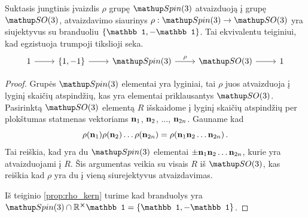 \begin{proposition}
	Suktasis jungtinis įvaizdis $\rho$ grupę $\spin$ atvaizduoją į grupę $\SO3$,
	atvaizdavimo siaurinys $\rho : \spin \to \SO3$ yra siujektyvus
	su branduoliu $\qty{\mathbb1,-\mathbb1}$.
	Tai ekvivalentu teiginiui, kad egzistuoja trumpoji tikslioji seka.
	\begin{equation}
		\begin{tikzcd}
			1 \arrow[r] &\{1,-1\} \arrow[r]	&\spin \arrow[r, "\rho"] &\SO3 \arrow[r] &1
		\end{tikzcd}
	\end{equation}
\end{proposition}
\begin{proof}
	Grupės $\spin$ elementai yra lyginiai,
	tai $\rho$ juos atvaizduoja į lyginį skaičių atspindžių,
	kas yra elementai priklausantys $\SO3$.
	Pasirinktą $\SO3$ elementą $R$ išskaidome į lyginį skaičių atspindžių
	per plokštumas statmenas vektoriams $\vb n_1$, $\vb n_2$, $\dots$, $\vb n_{2n}$.
	Gauname kad
	\begin{equation}
		\rho(\vb n_1)\rho(\vb n_2)\dots\rho(\vb n_{2n})
		=\rho(\vb n_1 \vb n_2 \dots \vb n_{2n})
		\,.
	\end{equation}
	Tai reiškia, kad yra du $\spin$ elementai $\pm \vb n_1 \vb n_2 \dots \vb n_{2n}$,
	kurie yra atvaizduojami į $R$.
	Šis argumentas veikia su visais $R$ iš $\SO3$,
	kas reiškia kad $\rho$ yra du į vieną siurejektyvus atvaizdavimas.

	Iš teiginio \ref{prop:rho_kern} turime kad branduolys yra
	$\spin \cap \set R^{\cross} \mathbb1 = \qty{\mathbb1,-\mathbb1}$.
\end{proof}

